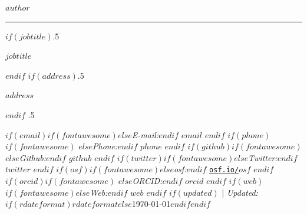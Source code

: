 
\usepackage{datetime}


\usepackage{orcidlink}




\centerline{\huge \bf $author$}

\vspace{2 mm}

\hrule

\vspace{2 mm}

$if(jobtitle)$\moveleft.5\hoffset\centerline{$jobtitle$}$endif$
$if(address)$\moveleft.5\hoffset\centerline{$address$}$endif$
\moveleft.5\hoffset\centerline{ $if(email)$$if(fontawesome)$\faEnvelopeO \hspace{1 mm}$else$\emph{E-mail:}$endif$ \href{mailto:}{\tt $email$} \hspace{1 mm}$endif$ $if(phone)$$if(fontawesome)$ \faPhone \hspace{1 mm}$else$\emph{Phone:}$endif$  $phone$  \hspace{1 mm} $endif$ $if(github)$$if(fontawesome)$\faGithub \hspace{1 mm}$else$\emph{Github:}$endif$ \href{http://github.com/$github$}{\tt $github$} \hspace{1 mm} $endif$  $if(twitter)$$if(fontawesome)$\faTwitter \hspace{1 mm}$else$\emph{Twitter:}$endif$ \href{https:/twitter.com/$twitter$}{\tt $twitter$} \hspace{1 mm} $endif$ $if(osf)$$if(fontawesome)$\faUnlock \hspace{1 mm}$else$\emph{osf:}$endif$ \href{https:/osf.io/$osf$}{\tt osf.io/$osf$} \hspace{1 mm} $endif$ $if(orcid)$$if(fontawesome)$ \hspace{.5 mm}$else$\emph{ORCID:}$endif$ \href{https://orcid.org/$orcid$}{\tt $orcid$} \hspace{1 mm} $endif$ $if(web)$$if(fontawesome)$\faGlobe \hspace{1 mm}$else$\emph{Web:}$endif$ \href{http://$web$}{\tt $web$}  $endif$ $if(updated)$ | \emph{Updated:} $if(rdateformat)$$rdateformat$$else$\apstylekinda\today$endif$$endif$}



